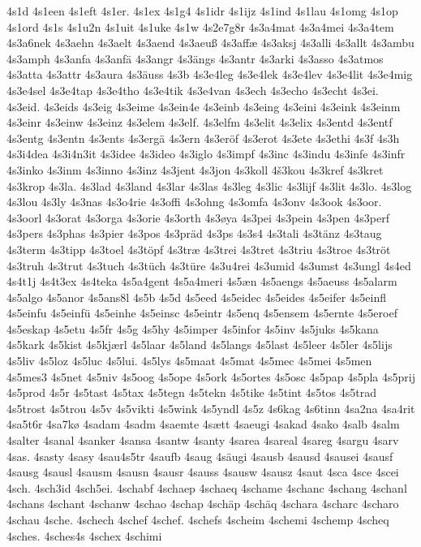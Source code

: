 4s1d
4s1een
4s1eft
4s1er.
4s1ex
4s1g4
4s1idr
4s1ijz
4s1ind
4s1lau
4s1omg
4s1op
4s1ord
4s1s
4s1u2n
4s1uit
4s1uke
4s1w
4s2e7g8r
4s3a4mat
4s3a4mei
4s3a4tem
4s3a6nek
4s3aehn
4s3aelt
4s3aend
4s3aeuß
4s3affæ
4s3aksj
4s3alli
4s3allt
4s3ambu
4s3amph
4s3anfa
4s3anfä
4s3angr
4s3ängs
4s3antr
4s3arki
4s3asso
4s3atmos
4s3atta
4s3attr
4s3aura
4s3äuss
4s3b
4s3e4leg
4s3e4lek
4s3e4lev
4s3e4lit
4s3e4mig
4s3e4sel
4s3e4tap
4s3e4tho
4s3e4tik
4s3e4van
4s3ech
4s3echo
4s3echt
4s3ei.
4s3eid.
4s3eids
4s3eig
4s3eime
4s3ein4e
4s3einb
4s3eing
4s3eini
4s3eink
4s3einm
4s3einr
4s3einw
4s3einz
4s3elem
4s3elf.
4s3elfm
4s3elit
4s3elix
4s3entd
4s3entf
4s3entg
4s3entn
4s3ents
4s3ergä
4s3ern
4s3eröf
4s3erot
4s3ete
4s3ethi
4s3f
4s3h
4s3i4dea
4s3i4n3it
4s3idee
4s3ideo
4s3iglo
4s3impf
4s3inc
4s3indu
4s3infe
4s3infr
4s3inko
4s3inm
4s3inno
4s3inz
4s3jent
4s3jon
4s3koll
4š3kou
4s3kref
4s3kret
4s3krop
4s3la.
4s3lad
4s3land
4s3lar
4s3las
4s3leg
4s3lic
4s3lijf
4s3lit
4s3lo.
4s3log
4s3lou
4s3ly
4s3nas
4s3o4rie
4s3offi
4s3ohng
4s3omfa
4s3onv
4s3ook
4s3oor.
4s3oorl
4s3orat
4s3orga
4s3orie
4s3orth
4s3øya
4s3pei
4s3pein
4s3pen
4s3perf
4s3pers
4s3phas
4s3pier
4s3pos
4s3präd
4s3ps
4s3s4
4s3tali
4s3tänz
4s3taug
4s3term
4s3tipp
4s3toel
4s3töpf
4s3træ
4s3trei
4s3tret
4s3triu
4s3troe
4s3tröt
4s3truh
4s3trut
4s3tuch
4s3tüch
4s3türe
4s3u4rei
4s3umid
4s3umst
4s3ungl
4s4ed
4s4t1j
4s4t3ex
4s4teka
4s5a4gent
4s5a4meri
4s5æn
4s5aengs
4s5aeuss
4s5alarm
4s5algo
4s5anor
4s5ans8l
4s5b
4s5d
4s5eed
4s5eidec
4s5eides
4s5eifer
4s5einfl
4s5einfu
4s5einfü
4s5einhe
4s5einsc
4s5eintr
4s5enq
4s5ensem
4s5ernte
4s5eroef
4s5eskap
4s5etu
4s5fr
4s5g
4s5hy
4s5imper
4s5infor
4s5inv
4s5juks
4s5kana
4s5kark
4s5kist
4s5kjærl
4s5laar
4s5land
4s5langs
4s5last
4s5leer
4s5ler
4s5lijs
4s5liv
4s5loz
4s5luc
4s5lui.
4s5lys
4s5maat
4s5mat
4s5mec
4s5mei
4s5men
4s5mes3
4s5net
4s5niv
4s5oog
4s5ope
4s5ork
4s5ortes
4s5osc
4s5pap
4s5pla
4s5prij
4s5prod
4s5r
4s5tast
4s5tax
4s5tegn
4s5tekn
4s5tike
4s5tint
4s5tos
4s5trad
4s5trost
4s5trou
4s5v
4s5vikti
4s5wink
4s5yndl
4s5z
4s6kag
4s6tinn
4sa2na
4sa4rit
4sa5t6r
4sa7kø
4sadam
4sadm
4saemte
4sætt
4saeugi
4sakad
4sako
4salb
4salm
4salter
4sanal
4sanker
4sansa
4santw
4santy
4sarea
4sareal
4sareg
4sargu
4sarv
4sas.
4sasty
4sasy
4sau4s5tr
4saufb
4saug
4säugi
4sausb
4sausd
4sausei
4sausf
4sausg
4sausl
4sausm
4sausn
4sausr
4sauss
4sausw
4sausz
4saut
4sca
4sce
4scei
4sch.
4sch3id
4sch5ei.
4schabf
4schaep
4schaeq
4schame
4schanc
4schang
4schanl
4schans
4schant
4schanw
4schao
4schap
4schäp
4schäq
4schara
4scharc
4scharo
4schau
4sche.
4schech
4schef
4schef.
4schefs
4scheim
4schemi
4schemp
4scheq
4sches.
4sches4s
4schex
4schimi
